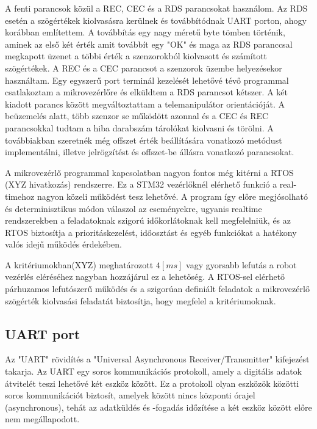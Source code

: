 A fenti parancsok közül a REC, CEC és a RDS parancsokat használom. Az RDS esetén a szögértékek kiolvasásra kerülnek és továbbítódnak UART porton, ahogy korábban említettem. A továbbítás egy nagy méretű byte tömben történik, aminek az első két érték amit továbbít egy "OK" és maga az RDS paranccsal megkapott üzenet a többi érték a szenzorokból kiolvasott és számított szögértékek. A REC és a CEC parancsot a szenzorok üzembe helyezésekor használtam. Egy egyszerű port terminál kezelését lehetővé tévő programmal csatlakoztam a mikrovezérlőre és elküldtem a RDS parancsot kétszer. A két kiadott parancs között megváltoztattam a telemanipulátor orientációját. A beüzemelés alatt, több szenzor se működött azonnal és a CEC és REC parancsokkal tudtam a hiba darabszám tárolókat kiolvasni és törölni. A továbbiakban szeretnék még offszet érték beállítására vonatkozó metódust implementálni, illetve jelrögzítést és offszet-be állásra vonatkozó parancsokat.

A mikrovezérlő programmal kapcsolatban nagyon fontos még kitérni a RTOS (XYZ hivatkozás) rendszerre. Ez a STM32 vezérlőknél elérhető funkció a real-timehoz nagyon közeli működést tesz lehetővé. A program így előre megjósolható és determinisztikus módon válaszol az eseményekre, ugyanis realtime rendszerekben a feladatoknak szigorú időkorlátoknak kell megfelelniük, és az RTOS biztosítja a prioritáskezelést, időosztást és egyéb funkciókat a hatékony valós idejű működés érdekében.


A kritériumokban(XYZ) meghatározott $4[ms]$ vagy gyorsabb lefutás a robot vezérlés eléréséhez nagyban hozzájárul ez a lehetőség. A RTOS-sel elérhető párhuzamos lefutószerű működés és a szigorúan definiált feladatok a mikrovezérlő szögérték kiolvasási feladatát biztosítja, hogy megfelel a kritériumoknak.

\subsection{UART port}
Az "UART" rövidítés a "Universal Asynchronous Receiver/Transmitter" kifejezést takarja. Az UART egy soros kommunikációs protokoll, amely a digitális adatok átvitelét teszi lehetővé két eszköz között. Ez a protokoll olyan eszközök közötti soros kommunikációt biztosít, amelyek között nincs központi órajel (asynchronous), tehát az adatküldés és -fogadás időzítése a két eszköz között előre nem megállapodott.

